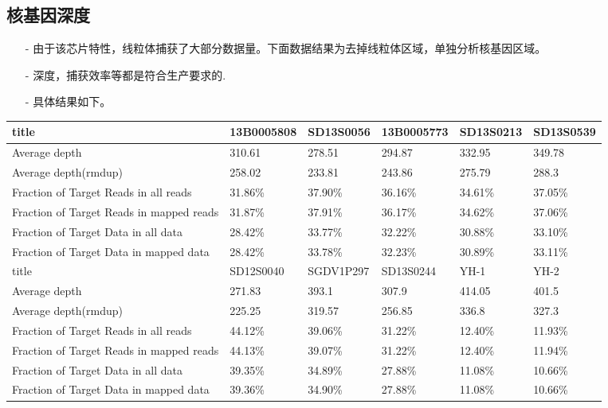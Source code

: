 \documentclass[a4paper,11pt]{article}
\makeatletter
\newcommand{\tabcaption}{\def\@captype{table}\caption}
\renewcommand\arraystretch{0.9}   %
\theoremstyle{mytheor}
\makeatother
\begin{document}
\begin{CJK*}{UTF8}{gbsn}
\subsection{核基因深度}
\begin{itemize}\setlength{\itemsep}{0pt}
\item[-] 由于该芯片特性，线粒体捕获了大部分数据量。下面数据结果为去掉线粒体区域，单独分析核基因区域。
\item[-] 深度，捕获效率等都是符合生产要求的.
\item[-] 具体结果如下。
\end{itemize}
\begin{center}
\renewcommand{\arraystretch}{1}
\fontsize{8}{12} \selectfont
\begin{tabular}[t]{l|l|l|l|l|l}
\hline
title	&	13B0005808	&	SD13S0056	&	13B0005773	&	SD13S0213	&	SD13S0539	\\
\hline
Average depth	&	310.61	&	278.51	&	294.87	&	332.95	&	349.78	\\
Average depth(rmdup)	&	258.02	&	233.81	&	243.86	&	275.79	&	288.3	\\
Fraction of Target Reads in all reads	&	31.86\%	&	37.90\%	&	36.16\%	&	34.61\%	&	37.05\%	\\
Fraction of Target Reads in mapped reads	&	31.87\%	&	37.91\%	&	36.17\%	&	34.62\%	&	37.06\%	\\
Fraction of Target Data in all data	&	28.42\%	&	33.77\%	&	32.22\%	&	30.88\%	&	33.10\%	\\
Fraction of Target Data in mapped data	&	28.42\%	&	33.78\%	&	32.23\%	&	30.89\%	&	33.11\%	\\
\hline
title	&	SD12S0040	&	SGDV1P297	&	SD13S0244	&	YH-1	&	YH-2	\\
\hline
Average depth	&	271.83	&	393.1	&	307.9	&	414.05	&	401.5	\\
Average depth(rmdup)	&	225.25	&	319.57	&	256.85	&	336.8	&	327.3	\\
Fraction of Target Reads in all reads	&	44.12\%	&	39.06\%	&	31.22\%	&	12.40\%	&	11.93\%	\\
Fraction of Target Reads in mapped reads	&	44.13\%	&	39.07\%	&	31.22\%	&	12.40\%	&	11.94\%	\\
Fraction of Target Data in all data	&	39.35\%	&	34.89\%	&	27.88\%	&	11.08\%	&	10.66\%	\\
Fraction of Target Data in mapped data	&	39.36\%	&	34.90\%	&	27.88\%	&	11.08\%	&	10.66\%	\\
\hline
\end{tabular}
\tabcaption{各样本核基因深度列表}
\end{center}


\end{CJK*}
\end{document}
